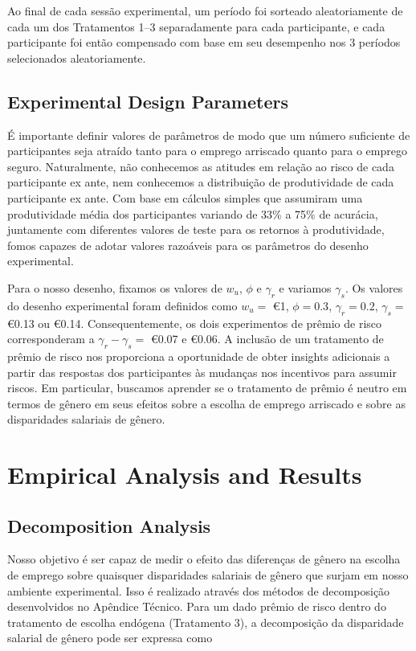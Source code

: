 \documentclass[a4paper,12pt]{article}[abntex2]
\begin{document}
Ao final de cada sessão experimental, um período foi sorteado aleatoriamente de cada um dos Tratamentos 1–3 separadamente para cada participante, e cada participante foi então compensado com base em seu desempenho nos 3 períodos selecionados aleatoriamente.

\subsection{\textbf{Experimental Design Parameters}}

É importante definir valores de parâmetros de modo que um número suficiente de participantes seja atraído tanto para o emprego arriscado quanto para o emprego seguro. Naturalmente, não conhecemos as atitudes em relação ao risco de cada participante ex ante, nem conhecemos a distribuição de produtividade de cada participante ex ante. Com base em cálculos simples que assumiram uma produtividade média dos participantes variando de 33\% a 75\% de acurácia, juntamente com diferentes valores de teste para os retornos à produtividade, fomos capazes de adotar valores razoáveis para os parâmetros do desenho experimental.

Para o nosso desenho, fixamos os valores de \( w_u \), \( \phi \) e \( \gamma_r \) e variamos \( \gamma_s \). Os valores do desenho experimental foram definidos como \( w_u = \) €1, \( \phi = 0.3 \), \( \gamma_r = 0.2 \), \( \gamma_s = \) €0.13 ou €0.14. Consequentemente, os dois experimentos de prêmio de risco corresponderam a \( \gamma_r - \gamma_s = \) €0.07 e €0.06. A inclusão de um tratamento de prêmio de risco nos proporciona a oportunidade de obter insights adicionais a partir das respostas dos participantes às mudanças nos incentivos para assumir riscos. Em particular, buscamos aprender se o tratamento de prêmio é neutro em termos de gênero em seus efeitos sobre a escolha de emprego arriscado e sobre as disparidades salariais de gênero.

\section{\textbf{Empirical Analysis and Results}}

\subsection{\textbf{Decomposition Analysis}}

Nosso objetivo é ser capaz de medir o efeito das diferenças de gênero na escolha de emprego sobre quaisquer disparidades salariais de gênero que surjam em nosso ambiente experimental. Isso é realizado através dos métodos de decomposição desenvolvidos no Apêndice Técnico. Para um dado prêmio de risco dentro do tratamento de escolha endógena (Tratamento 3), a decomposição da disparidade salarial de gênero pode ser expressa como
\end{document}
